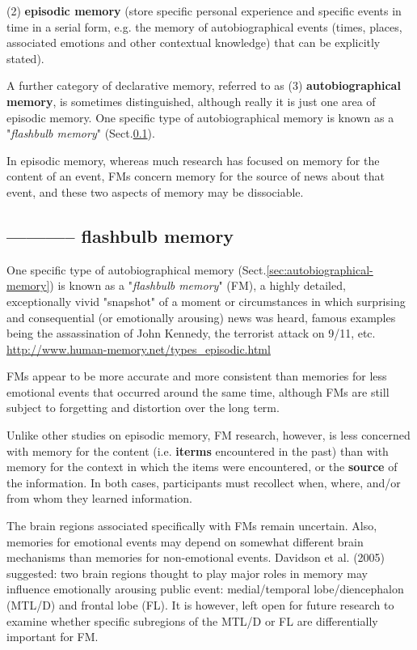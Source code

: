 (2) {\bf episodic memory} (store specific personal experience and specific
events in time in a serial form, e.g. the memory of autobiographical events
(times, places, associated emotions and other contextual knowledge) that can be
explicitly stated). 

A further category of declarative memory, referred to as (3) {\bf
autobiographical memory}, is sometimes distinguished, although really it is just
one area of episodic memory. 
One specific type of autobiographical memory is known as a "{\it flashbulb
memory}" (Sect.\ref{sec:flashbulb-memory}).

In episodic memory, whereas much research has focused on memory for the content
of an event, FMs concern memory for the source of news about that event, and
these two aspects of memory may be dissociable.

\subsection{----------- flashbulb memory}
\label{sec:flashbulb-memory}

One specific type of autobiographical memory
(Sect.\ref{sec:autobiographical-memory}) is known as a "{\it flashbulb memory}"
(FM), a highly detailed, exceptionally vivid "snapshot" of a moment or
circumstances in which surprising and consequential (or emotionally arousing)
news was heard, famous examples being the assassination of John Kennedy, the
terrorist attack on 9/11, etc.
\url{http://www.human-memory.net/types_episodic.html}

FMs appear to be more accurate and more consistent than memories for less
emotional events that occurred around the same time, although FMs are still
subject to forgetting and distortion over the long term.

Unlike other studies on episodic memory, FM research, however, is less concerned
with memory for the content (i.e. {\bf iterms} encountered in the past) than with
memory for the context in which the items were encountered, or the {\bf source}
of the information. In both cases, participants must recollect when, where,
and/or from whom they learned information.


The brain regions associated specifically with FMs remain uncertain.
Also, memories for emotional events may depend on somewhat different brain
mechanisms than memories for non-emotional events. Davidson et al. (2005)
suggested: two brain regions thought to play major roles in memory may influence
emotionally arousing public event: medial/temporal lobe/diencephalon (MTL/D) and
frontal lobe (FL). It is however, left open for future research to examine
whether specific subregions of the MTL/D or FL are differentially important for
FM.

